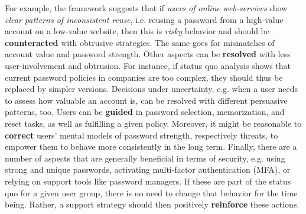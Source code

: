 \vspace*{1em}
\noindent
{}
\vspace*{1em}

\noindent For example, the framework suggests that if \textit{users of online web-services} show \textit{clear patterns of inconsistent reuse}, i.e. reusing a password from a high-value account on a low-value website, then this is \textit{risky }behavior and should be \textbf{counteracted} with obtrusive strategies. The same goes for mismatches of account value and password strength. Other aspects can be \textbf{resolved} with less user-involvement and obtrusion. For instance, if status quo analysis shows that current password policies in companies are too complex, they should thus be replaced by simpler versions. Decisions under uncertainty, e.g. when a user needs to assess how valuable an account is, can be resolved with different persuasive patterns, too. Users can be \textbf{guided} in password selection, memorization, and reset tasks, as well as fulfilling a given policy. Moreover, it might be reasonable to \textbf{correct} users' mental models of password strength, respectively threats, to empower them to behave more consistently in the long term. Finally, there are a number of aspects that are generally beneficial in terms of security, e.g. using strong and unique passwords, activating multi-factor authentication (MFA), or relying on support tools like password managers. If these are part of the status quo for a given user group, there is no need to change that behavior for the time being. Rather, a support strategy should then positively \textbf{reinforce} these actions. 

